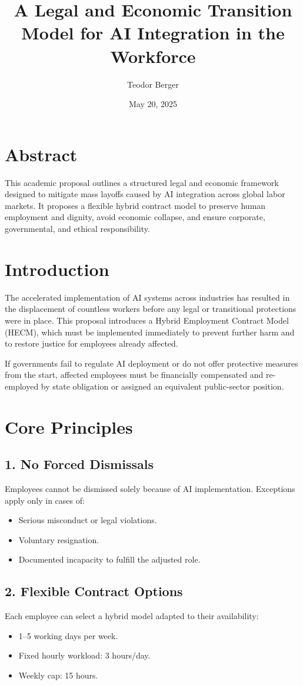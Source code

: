 \documentclass[12pt]{article}
\title{\large A Legal and Economic Transition Model for AI Integration in the Workforce}
\author{Teodor Berger}
\date{May 20, 2025}
\begin{document}
\maketitle

\section*{Abstract}
This academic proposal outlines a structured legal and economic framework designed to mitigate mass layoffs caused by AI integration across global labor markets. It proposes a flexible hybrid contract model to preserve human employment and dignity, avoid economic collapse, and ensure corporate, governmental, and ethical responsibility.

\section{Introduction}
The accelerated implementation of AI systems across industries has resulted in the displacement of countless workers before any legal or transitional protections were in place. This proposal introduces a Hybrid Employment Contract Model (HECM), which must be implemented immediately to prevent further harm and to restore justice for employees already affected.

If governments fail to regulate AI deployment or do not offer protective measures from the start, affected employees must be financially compensated and re-employed by state obligation or assigned an equivalent public-sector position.

\section{Core Principles}

\subsection{1. No Forced Dismissals}
Employees cannot be dismissed solely because of AI implementation. Exceptions apply only in cases of:
\begin{itemize}
  \item Serious misconduct or legal violations.
  \item Voluntary resignation.
  \item Documented incapacity to fulfill the adjusted role.
\end{itemize}

\subsection{2. Flexible Contract Options}
Each employee can select a hybrid model adapted to their availability:
\begin{itemize}
  \item 1–5 working days per week.
  \item Fixed hourly workload: 3 hours/day.
  \item Weekly cap: 15 hours.
\end{itemize}
\end{document}
